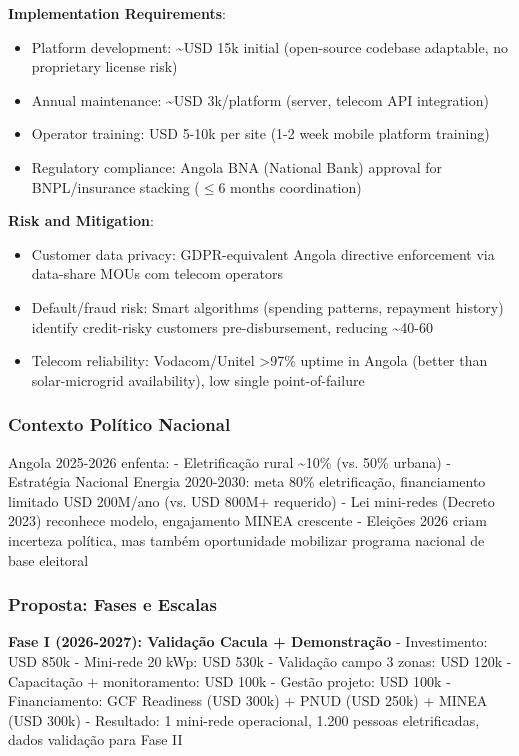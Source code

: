 \documentclass[12pt, a4paper]{article}
\begin{document}
\textbf{Implementation Requirements}:
\begin{itemize}
\item Platform development: \textasciitilde{}USD 15k initial (open-source codebase adaptable, no proprietary license risk)
\item Annual maintenance: \textasciitilde{}USD 3k/platform (server, telecom API integration)
\item Operator training: USD 5-10k per site (1-2 week mobile platform training)
\item Regulatory compliance: Angola BNA (National Bank) approval for BNPL/insurance stacking ($\leq$6 months coordination)
\end{itemize}

\textbf{Risk and Mitigation}:
\begin{itemize}
\item Customer data privacy: GDPR-equivalent Angola directive enforcement via data-share MOUs com telecom operators
\item Default/fraud risk: Smart algorithms (spending patterns, repayment history) identify credit-risky customers pre-disbursement, reducing \textasciitilde{}40-60%
\item Telecom reliability: Vodacom/Unitel >97\% uptime in Angola (better than solar-microgrid availability), low single point-of-failure
\end{itemize}

\subsubsection{Contexto Político Nacional}

Angola 2025-2026 enfenta:
- Eletrificação rural \textasciitilde{}10\% (vs. 50\% urbana)
- Estratégia Nacional Energia 2020-2030: meta 80\% eletrificação, financiamento limitado USD 200M/ano (vs. USD 800M+ requerido)
- Lei mini-redes (Decreto 2023) reconhece modelo, engajamento MINEA crescente
- Eleições 2026 criam incerteza política, mas também oportunidade mobilizar programa nacional de base eleitoral

\subsubsection{Proposta: Fases e Escalas}

\textbf{Fase I (2026-2027): Validação Cacula + Demonstração}
- Investimento: USD 850k
  - Mini-rede 20 kWp: USD 530k
  - Validação campo 3 zonas: USD 120k
  - Capacitação + monitoramento: USD 100k
  - Gestão projeto: USD 100k
- Financiamento: GCF Readiness (USD 300k) + PNUD (USD 250k) + MINEA (USD 300k)
- Resultado: 1 mini-rede operacional, 1.200 pessoas eletrificadas, dados validação para Fase II
\end{document}
